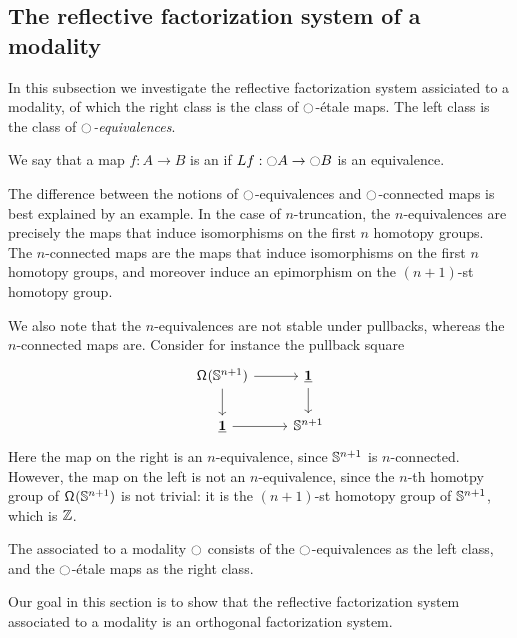 \subsection{The reflective factorization system of a modality}

In this subsection we investigate the reflective factorization system assiciated to a modality, of which the right class is the class of ${\ocircle}$-\'etale maps. The left class is the class of \emph{${\ocircle}$-equivalences}.
\begin{defn}
We say that a map $f:A\to B$ is an  if $L f:{\ocircle} A\to {\ensuremath{\ocircle}} B$ is an equivalence.
\end{defn}

\begin{rmk}
The difference between the notions of ${\ocircle}$-equivalences and ${\ocircle}$-connected maps is best explained by an example. In the case of $n$-truncation, the $n$-equivalences are precisely the maps that induce isomorphisms on the first $n$ homotopy groups. The $n$-connected maps are the maps that induce isomorphisms on the first $n$ homotopy groups, and moreover induce an epimorphism on the $(n+1)$-st homotopy group. 

We also note that the $n$-equivalences are not stable under pullbacks, whereas the $n$-connected maps are. Consider for instance the pullback square
\begin{equation*}
\begin{tikzcd}
\loopspace {\sphere{n+1}} \arrow[r] \arrow[d] & \unit \arrow[d] \\
\unit\arrow[r] & \sphere{n+1}
\end{tikzcd}
\end{equation*}
Here the map on the right is an $n$-equivalence, since $\mathbb{S}^{n+1}$ is $n$-connected. However, the map on the left is not an $n$-equivalence, since the $n$-th homotpy group of $\mathsf{\Omega}^{}(\mathbb{S}^{n+1})$ is not trivial: it is the $(n+1)$-st homotopy group of $\mathbb{S}^{n+1}$, which is $\mathbb{Z}$.
\end{rmk}

\begin{defn}
The  associated to a modality ${\ocircle}$ consists of the ${\ocircle}$-equivalences as the left class, and the ${\ocircle}$-\'etale maps as the right class.
\end{defn}

Our goal in this section is to show that the reflective factorization system associated to a modality is an orthogonal factorization system.

